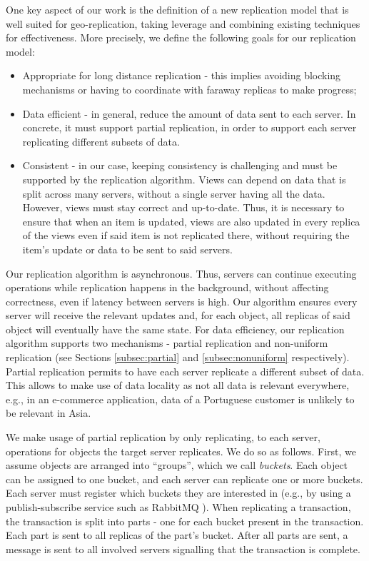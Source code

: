 One key aspect of our work is the definition of a new replication model that is well suited for geo-replication, taking leverage and combining existing techniques for effectiveness.
More precisely, we define the following goals for our replication model:
\begin{itemize}
	\item Appropriate for long distance replication - this implies avoiding blocking mechanisms or having to coordinate with faraway replicas to make progress;
	\item Data efficient - in general, reduce the amount of data sent to each server.
	In concrete, it must support partial replication, in order to support each server replicating different subsets of data.
	\item Consistent - in our case, keeping consistency is challenging and must be supported by the replication algorithm.
	Views can depend on data that is split across many servers, without a single server having all the data.
	However, views must stay correct and up-to-date.
	Thus, it is necessary to ensure that when an item is updated, views are also updated in every replica of the views even if said item is not replicated there, without requiring the item's update or data to be sent to said servers.
\end{itemize}

Our replication algorithm is asynchronous.
Thus, servers can continue executing operations while replication happens in the background, without affecting correctness, even if latency between servers is high.
Our algorithm ensures every server will receive the relevant updates and, for each object, all replicas of said object will eventually have the same state.
For data efficiency, our replication algorithm supports two mechanisms - partial replication and non-uniform replication (see Sections \ref{subsec:partial} and \ref{subsec:nonuniform} respectively).
Partial replication permits to have each server replicate a different subset of data.
This allows to make use of data locality as not all data is relevant everywhere, e.g., in an e-commerce application, data of a Portuguese customer is unlikely to be relevant in Asia.

We make usage of partial replication by only replicating, to each server, operations for objects the target server replicates.
We do so as follows.
First, we assume objects are arranged into ``groups'', which we call \emph{buckets}.
Each object can be assigned to one bucket, and each server can replicate one or more buckets.
Each server must register which buckets they are interested in (e.g., by using a publish-subscribe service such as RabbitMQ \cite{???}).
When replicating a transaction, the transaction is split into parts - one for each bucket present in the transaction.
Each part is sent to all replicas of the part's bucket.
After all parts are sent, a message is sent to all involved servers signalling that the transaction is complete.

